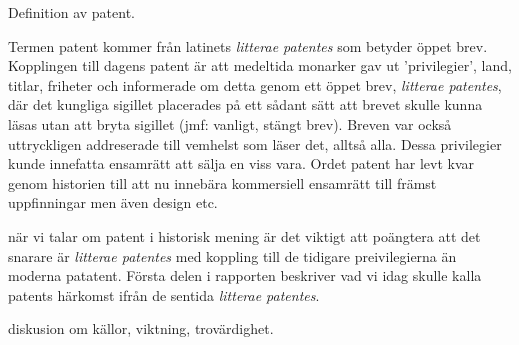 Definition av patent.

Termen patent kommer från latinets \emph{litterae patentes} som betyder öppet 
brev. Kopplingen till dagens patent är att medeltida monarker gav ut
'privilegier', land, titlar, friheter och informerade om detta genom ett öppet 
brev, \emph{litterae patentes}, där det kungliga sigillet placerades på ett
sådant sätt att brevet skulle kunna läsas utan att bryta sigillet (jmf: 
vanligt, stängt brev). Breven var också uttryckligen addreserade till 
vemhelst som läser det, alltså alla. Dessa privilegier kunde innefatta ensamrätt
att sälja en viss vara. Ordet patent har levt kvar genom historien till 
att nu innebära kommersiell ensamrätt till främst uppfinningar men även 
design etc. \cite{blackstone vad hänvisas?}

när vi talar om patent i historisk mening är det viktigt att poängtera att det 
snarare är \emph{litterae patentes} med koppling till de tidigare 
preivilegierna än moderna patatent. Första delen i rapporten beskriver vad vi 
idag skulle kalla patents härkomst ifrån de sentida \emph{litterae patentes}.

diskusion om källor, viktning, trovärdighet.

